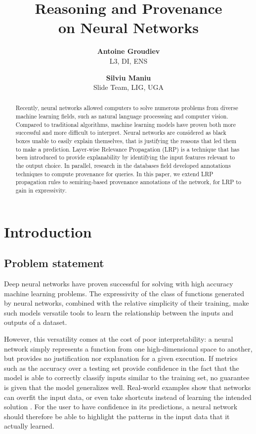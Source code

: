 \documentclass{../cs-classes/cs-classes}
\title{Reasoning and Provenance\\ on Neural Networks}
\author{
    \textbf{Antoine Groudiev}\\L3, DI, ENS
    \and
    \textbf{Silviu Maniu}\\Slide Team, LIG, UGA
}
\begin{document}
\begin{abstract}
    Recently, neural networks allowed computers to solve numerous problems from diverse machine learning fields, such as natural language processsing and computer vision. Compared to traditional algorithms, machine learning models have proven both more successful and more difficult to interpret. Neural networks are considered as black boxes unable to easily explain themselves, that is justifying the reasons that led them to make a prediction. Layer-wise Relevance Propagation (LRP) is a technique that has been introduced to provide explanability by identifying the input features relevant to the output choice. In parallel, research in the databases field developed annotations techniques to compute provenance for queries. In this paper, we extend LRP propagation rules to semiring-based provenance annotations of the network, for LRP to gain in expressivity.
\end{abstract}

\section{Introduction}
\subsection{Problem statement}
Deep neural networks have proven successful for solving with high accuracy machine learning problems. The expressivity of the class of functions generated by neural networks, combined with the relative simplicity of their training, make such models versatile tools to learn the relationship between the inputs and outputs of a dataset.

However, this versatility comes at the cost of poor interpretability: a neural network simply represents a function from one high-dimensional space to another, but provides no justification nor explanation for a given execution. If metrics such as the accuracy over a testing set provide confidence in the fact that the model is able to correctly classify inputs similar to the training set, no guarantee is given that the model generalizes well. Real-world examples show that networks can overfit the input data, or even take shortcuts instead of learning the intended solution \cite{shortcuts}. For the user to have confidence in its predictions, a neural network should therefore be able to highlight the patterns in the input data that it actually learned.
\end{document}
